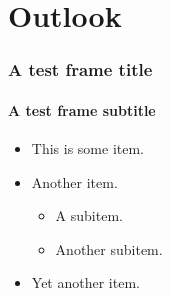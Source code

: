 \section{Outlook}
\begin{frame}
\frametitle{A test frame title}
\framesubtitle{A test frame subtitle}
\begin{itemize}
  \item This is some item.
  \item Another item.
  \begin{itemize}
    \item A subitem.
    \item Another subitem.
  \end{itemize}
  \item Yet another item.
\end{itemize}
\end{frame}